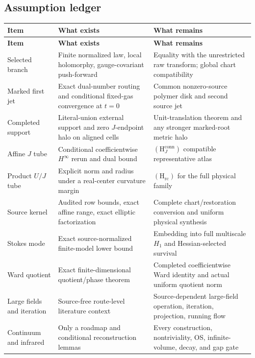 \documentclass[11pt]{article}
\theoremstyle{definition}
\newcommand{\Hrc}{(\mathrm H_{\mathrm{rc}})}
\newcommand{\HJ}{(\mathrm H_J^{\mathrm{conn}})}
\begin{document}
\subsection{Assumption ledger}

\begin{longtable}{>{\raggedright\arraybackslash}p{}
                  >{\raggedright\arraybackslash}p{}
                  >{\raggedright\arraybackslash}p{}}
\toprule
\textbf{Item} & \textbf{What exists} & \textbf{What remains} \\
\midrule
\endfirsthead
\toprule
\textbf{Item} & \textbf{What exists} & \textbf{What remains} \\
\midrule
\endhead
Selected branch &
Finite normalized law, local holomorphy, gauge-covariant push-forward &
Equality with the unrestricted raw transform; global chart compatibility \\

Marked first jet &
Exact dual-number routing and conditional fixed-gas convergence at \(t=0\) &
Common nonzero-source polymer disk and second source jet \\

Completed support &
Literal-union external support and zero \(J\)-endpoint halo on aligned cells &
Unit-translation theorem and any stronger marked-root metric halo \\

Affine \(J\) tube &
Conditional coefficientwise \(H^\infty\) rerun and dual bound &
\(\HJ\) compatible representative atlas \\

Product \(U/J\) tube &
Explicit norm and radius under a real-center curvature margin &
\(\Hrc\) for the full physical family \\

Source kernel &
Audited row bounds, exact affine range, exact elliptic factorization &
Complete chart/restoration conversion and uniform physical synthesis \\

Stokes mode &
Exact source-normalized finite-model lower bound &
Embedding into full multiscale \(H_1\) and Hessian-selected survival \\

Ward quotient &
Exact finite-dimensional quotient/phase theorem &
Completed coefficientwise Ward identity and actual uniform quotient norm \\

Large fields and iteration &
Source-free route-level literature context &
Source-dependent large-field operation, iteration, projection, running flow \\

Continuum and infrared &
Only a roadmap and conditional reconstruction lemmas &
Every construction, nontriviality, OS, infinite-volume, decay, and gap gate \\
\bottomrule
\end{longtable}
\end{document}
